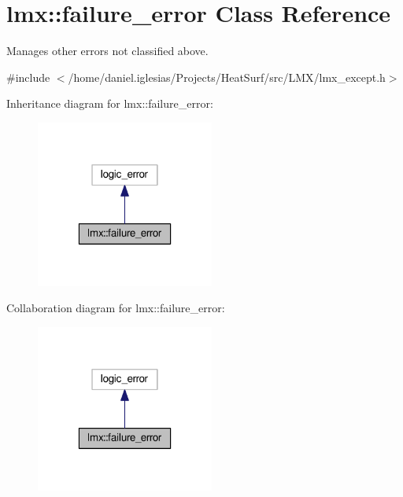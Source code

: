 \hypertarget{classlmx_1_1failure__error}{\section{lmx\-:\-:failure\-\_\-error Class Reference}
\label{classlmx_1_1failure__error}
}


Manages other errors not classified above.  




{\ttfamily \#include $<$/home/daniel.\-iglesias/\-Projects/\-Heat\-Surf/src/\-L\-M\-X/lmx\-\_\-except.\-h$>$}



Inheritance diagram for lmx\-:\-:failure\-\_\-error\-:
\nopagebreak
\begin{figure}[H]
\begin{center}
\leavevmode
\includegraphics[width=166pt]{classlmx_1_1failure__error__inherit__graph}
\end{center}
\end{figure}


Collaboration diagram for lmx\-:\-:failure\-\_\-error\-:
\nopagebreak
\begin{figure}[H]
\begin{center}
\leavevmode
\includegraphics[width=166pt]{classlmx_1_1failure__error__coll__graph}
\end{center}
\end{figure}
